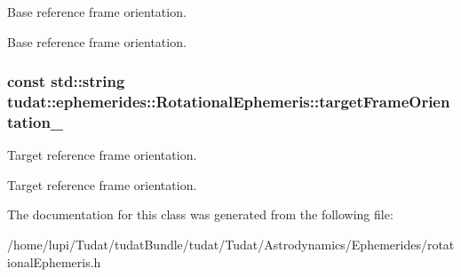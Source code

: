 Base reference frame orientation. 

Base reference frame orientation. 
\subsubsection[{\texorpdfstring{target\+Frame\+Orientation\+\_\+}{targetFrameOrientation_}}]{\setlength{\rightskip}{0pt plus 5cm}const std\+::string tudat\+::ephemerides\+::\+Rotational\+Ephemeris\+::target\+Frame\+Orientation\+\_\+\hspace{0.3cm}{\ttfamily [protected]}}\hypertarget{classtudat_1_1ephemerides_1_1RotationalEphemeris_a113566bbf2ec56dc623466c98dab0454}{}\label{classtudat_1_1ephemerides_1_1RotationalEphemeris_a113566bbf2ec56dc623466c98dab0454}


Target reference frame orientation. 

Target reference frame orientation. 

The documentation for this class was generated from the following file\+:\begin{DoxyCompactItemize}
\item 
/home/lupi/\+Tudat/tudat\+Bundle/tudat/\+Tudat/\+Astrodynamics/\+Ephemerides/rotational\+Ephemeris.\+h\end{DoxyCompactItemize}
